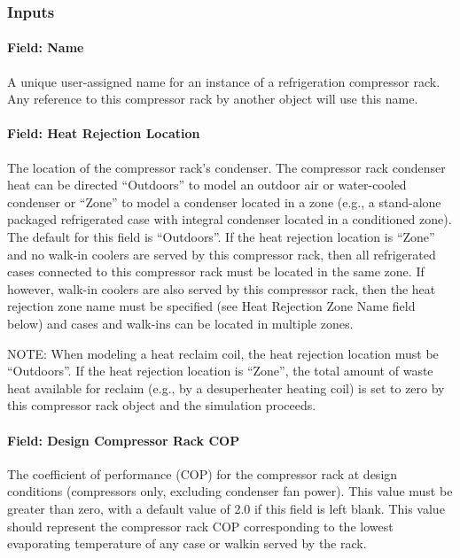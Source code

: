 \subsubsection{Inputs}\label{inputs-039}

\paragraph{Field: Name}\label{field-name-038}

A unique user-assigned name for an instance of a refrigeration compressor rack. Any reference to this compressor rack by another object will use this name.

\paragraph{Field: Heat Rejection Location}\label{field-heat-rejection-location}

The location of the compressor rack's condenser. The compressor rack condenser heat can be directed ``Outdoors'' to model an outdoor air or water-cooled condenser or ``Zone'' to model a condenser located in a zone (e.g., a stand-alone packaged refrigerated case with integral condenser located in a conditioned zone). The default for this field is ``Outdoors''. If the heat rejection location is ``Zone'' and no walk-in coolers are served by this compressor rack, then all refrigerated cases connected to this compressor rack must be located in the same zone. If however, walk-in coolers are also served by this compressor rack, then the heat rejection zone name must be specified (see Heat Rejection Zone Name field below) and cases and walk-ins can be located in multiple zones.

NOTE: When modeling a heat reclaim coil, the heat rejection location must be ``Outdoors''. If the heat rejection location is ``Zone'', the total amount of waste heat available for reclaim (e.g., by a desuperheater heating coil) is set to zero by this compressor rack object and the simulation proceeds.

\paragraph{Field: Design Compressor Rack COP}\label{field-design-compressor-rack-cop}

The coefficient of performance (COP) for the compressor rack at design conditions (compressors only, excluding condenser fan power). This value must be greater than zero, with a default value of 2.0 if this field is left blank. This value should represent the compressor rack COP corresponding to the lowest evaporating temperature of any case or walkin served by the rack.

